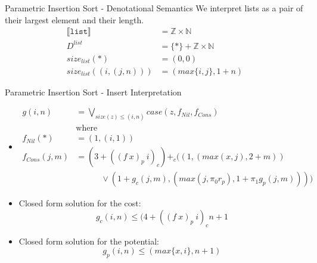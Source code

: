 \documentclass[pdf]{beamer}
\newcommand{\T}[1]{\texttt{#1}}
\newcommand{\LB}{\llbracket}
\newcommand{\RB}{\rrbracket}
\newcommand{\quadthree}{\qquad\quad}
\begin{document}
\begin{frame}{Parametric Insertion Sort - Denotational Semantics}
  We interpret lists as a pair of their largest element and their length.
  \begin{align*}
    \LB \T{list} \RB &= \mathbb{Z} \times \mathbb{N} \\
            D^{list} &= \{\ast\} + \mathbb{Z} \times \mathbb{N} \\
  size_{list} (\ast) &= (0,0) \\
size_{list} ((i,(j,n))) &= (max\{i,j\},1 + n)
  \end{align*}

\end{frame}

\begin{frame}{Parametric Insertion Sort - Insert Interpretation}
  \begin{itemize}
    \item[]
      \small
      \begin{align*}
      g(i,n) &= \bigvee\limits_{size(z) \leq (i,n)} case(z, f_{Nil}, f_{Cons}) \\
             &\text{where}\\
      f_{Nil}(\ast) &= (1, (i, 1)) \\
        f_{Cons}(j,m) &= (3 + ((f\ x)_p\ i)_c) +_c ((1, (max(x,j), 2 + m)) \\
                    &\quadthree \vee (1 + g_c(j,m), (max(j,\pi_0 r_p), 1 + \pi_1 g_p(j,m))))
      \end{align*}
    \item Closed form solution for the cost:
      \[g_c(i,n) \leq (4 + ((f\ x)_p\ i)_c n + 1\]
    \item Closed form solution for the potential:
      \[g_p(i,n) \leq (max\{x, i\}, n+1)\]
  \end{itemize}

\end{frame}
\end{document}
